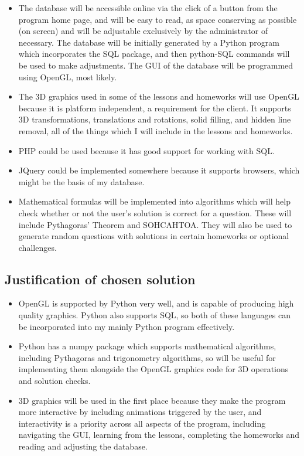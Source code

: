 \begin{itemize}
	\item The database will be accessible online via the click of a button from the program home page, and will be easy to read, as space conserving as possible (on screen) and will be adjustable exclusively by the administrator of necessary. The database will be initially generated by a Python program which incorporates the SQL package, and then python-SQL commands will be used to make adjustments. The GUI of the database will be programmed using OpenGL, most likely.

	\item The 3D graphics used in some of the lessons and homeworks will use OpenGL because it is platform independent, a requirement for the client. It supports 3D transformations, translations and rotations, solid filling, and hidden line removal, all of the things which I will include in the lessons and homeworks.

	\item PHP could be used because it has good support for working with SQL.

	\item JQuery could be implemented somewhere because it supports browsers, which might be the basis of my database.

	\item Mathematical formulas will be implemented into algorithms which will help check whether or not the user's solution is correct for a question. These will include Pythagoras' Theorem and SOHCAHTOA. They will also be used to generate random questions with solutions in certain homeworks or optional challenges.

\end{itemize}

\subsection{Justification of chosen solution}

\begin{itemize}
	\item OpenGL is supported by Python very well, and is capable of producing high quality graphics. Python also supports SQL, so both of these languages can be incorporated into my mainly Python program effectively.

	\item Python has a numpy package which supports mathematical algorithms, including Pythagoras and trigonometry algorithms, so will be useful for implementing them alongside the OpenGL graphics code for 3D operations and solution checks.

	\item  3D graphics will be used in the first place because they make the program more interactive by including animations triggered by the user, and interactivity is a priority across all aspects of the program, including navigating the GUI, learning from the lessons, completing the homeworks and reading and adjusting the database.

\end{itemize}